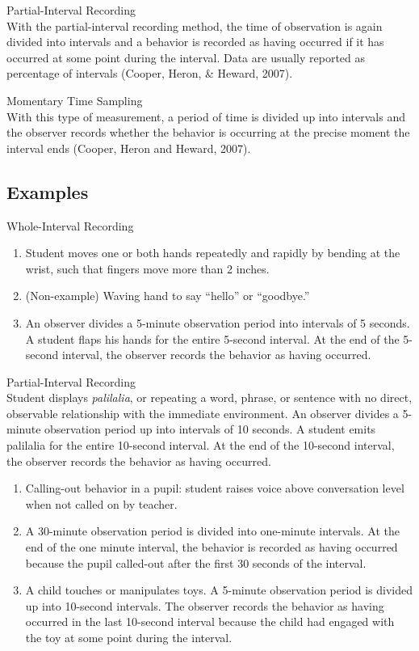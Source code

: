 Partial-Interval Recording\\
With the partial-interval recording method, the time of observation is again divided into intervals and a behavior is recorded as having occurred if it has occurred at some point during the interval. Data are usually reported as percentage of intervals (Cooper, Heron, \& Heward, 2007).

Momentary Time Sampling\\
With this type of measurement, a period of time is divided up into intervals and the observer records whether the behavior is occurring at the precise moment the interval ends (Cooper, Heron and Heward, 2007).

\subsection{Examples}
Whole-Interval Recording
\begin{enumerate}
\item Student moves one or both hands repeatedly and rapidly by bending at the wrist, such that fingers move more than 2 inches. 
\item (Non-example) Waving hand to say ``hello'' or ``goodbye.''
\item An observer divides a 5-minute observation period into intervals of 5 seconds. A student flaps his hands for the entire 5-second interval. At the end of the 5-second interval, the observer records the behavior as having occurred.
\end{enumerate}
%
Partial-Interval Recording\\
Student displays \textit{palilalia}, or repeating a word, phrase, or sentence with no direct, observable relationship with the immediate environment. An observer divides a 5-minute observation period up into intervals of 10 seconds. A student emits palilalia for the entire 10-second interval. At the end of the 10-second interval, the observer records the behavior as having occurred.
\begin{enumerate}
\item Calling-out behavior in a pupil: student raises voice above conversation level when not called on by teacher.
\item A 30-minute observation period is divided into one-minute intervals.  At the end of the one minute interval, the behavior is recorded as having occurred because the pupil called-out after the first 30 seconds of the interval.
\item A child touches or manipulates toys. A 5-minute observation period is divided up into 10-second intervals. The observer records the behavior as having occurred in the last 10-second interval because the child had engaged with the toy at some point during the interval. 
\end{enumerate}


